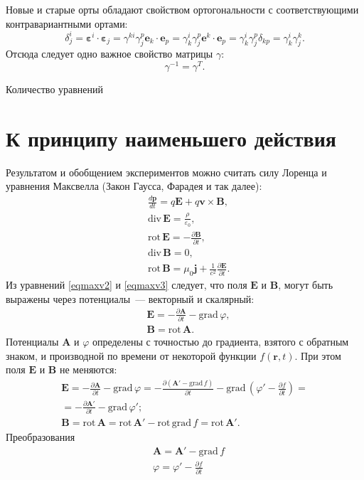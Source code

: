 \documentclass[a4paper,14pt]{extreport} %
\newcommand{\dff}[2]{\frac{\partial #1}{\partial #2}}
\newcommand{\Dff}[2]{\frac{d #1}{d #2}}
\renewcommand{\vec}[1]{\bm{#1}}
\renewcommand{\div}{\mathrm{div}\,}
\newcommand{\rot}{\mathrm{rot}\,}
\newcommand{\grad}{\mathrm{grad}\,}
\newcommand{\eps}{\varepsilon}
\begin{document}
	Новые и старые орты обладают свойством ортогональности с соответствующими контравариантными ортами:
	\[
		\delta_j^i = 
		\vec{\eps}^i\cdot\vec{\eps}_j = 
		\gamma^{ki} \gamma^p_j \vec{e}_k\cdot\vec{e}_p = 
		\gamma^i_k \gamma^p_j \vec{e}^k\cdot\vec{e}_p = 
		\gamma^i_k \gamma^p_j \delta_{kp} =
		\gamma^i_k \gamma^k_j.
	\]
	Отсюда следует одно важное свойство матрицы $\gamma$:
	\[
		\gamma^{-1} = \gamma^T.
	\]
	
	Количество уравнений 
	
	\chapter{К принципу наименьшего действия}
	
	Результатом и обобщением экспериментов можно считать силу Лоренца и уравнения Максвелла (Закон Гаусса, Фарадея и так далее):
	\begin{align}
		& \Dff{\vec{p}}{t} = q \vec{E} + q \vec{v} \times \vec{B}, \label{eqlor}\\
		& \div \vec{E} = \frac{\rho}{\eps_0}, \label{eqmaxv1}\\
		& \rot \vec{E} = - \dff{\vec{B}}{t}, \label{eqmaxv2}\\
		& \div \vec{B} = 0, \label{eqmaxv3}\\
		& \rot \vec{B} = \mu_0 \vec{j} + \frac{1}{c^2} \dff{\vec{E}}{t}.\label{eqmaxv4}
	\end{align}
	Из уравнений \eqref{eqmaxv2} и \eqref{eqmaxv3} следует, что поля $\vec{E}$ и $\vec{B}$, могут быть выражены через потенциалы~--- векторный и скалярный:
	\begin{align}
		& \vec{E} = - \dff{\vec{A}}{t} - \grad \varphi, \label{eqvece}\\
		& \vec{B} = \rot \vec{A}. \label{eqvecb}
	\end{align}
	Потенциалы $\vec{A}$ и $\varphi$ определены с точностью до градиента, взятого с обратным знаком, и производной по времени от некоторой функции $f(\vec{r}, t)$. При этом поля $\vec{E}$ и $\vec{B}$ не меняются:
	\begin{gather*}
		\vec{E} = - \dff{\vec{A}}{t} - \grad \varphi = - \dff{(\vec{A}' - \grad f)}{t}  - \grad \left(\varphi' - \dff{f}{t}\right) = \\ 
		= - \dff{\vec{A}'}{t} - \grad \varphi'; \\
		\vec{B} = \rot \vec{A} = \rot \vec{A}' - \rot \grad f = \rot \vec{A}'.
	\end{gather*}
	Преобразования 
	\begin{align*}
		& \vec{A} = \vec{A}' - \grad f \\
		& \varphi = \varphi' - \dff{f}{t}
	\end{align*}
\end{document}

